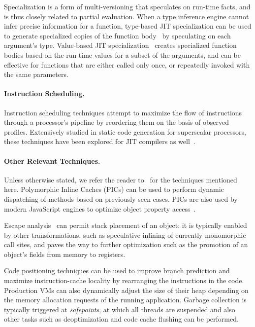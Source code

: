 Specialization is a form of multi-versioning that speculates on run-time facts, and is thus closely related to partial evaluation. When a type inference engine cannot infer precise information for a function, type-based JIT specialization can be used to generate specialized copies of the function body~\cite{Cooper92} by speculating on each argument's type. Value-based JIT specialization~\cite{Santos13} creates specialized function bodies based on the run-time values for a subset of the arguments, and can be effective for functions that are either called only once, or repeatedly invoked with the same parameters.

\paragraph*{Instruction Scheduling.} Instruction scheduling techniques attempt to maximize the flow of instructions through a processor's pipeline by reordering them on the basis of observed profiles. Extensively studied in static code generation for superscalar processors, these techniques have been explored for JIT compilers as well~\cite{Arnold05, Touati14}.

\paragraph*{Other Relevant Techniques.} Unless otherwise stated, we refer the reader to~\cite{Arnold05} for the techniques mentioned here. Polymorphic Inline Caches (PICs) can be used to perform dynamic dispatching of methods based on previously seen cases. PICs are also used by modern JavaScript engines to optimize object property access~\cite{ChevalierBoisvert16}.

\noindent Escape analysis~\cite{Choi99} can permit stack placement of an object: it is typically enabled by other transformations, such as speculative inlining of currently monomorphic call sites, and paves the way to further optimization such as the promotion of an object's fields from memory to registers.

Code positioning techniques can be used to improve branch prediction and maximize instruction-cache locality by rearranging the instructions in the code. Production VMs can also dynamically adjust the size of their heap depending on the memory allocation requests of the running application. Garbage collection is typically triggered at {\em safepoints}, at which all threads are suspended and also other tasks such as deoptimization and code cache flushing can be performed.

